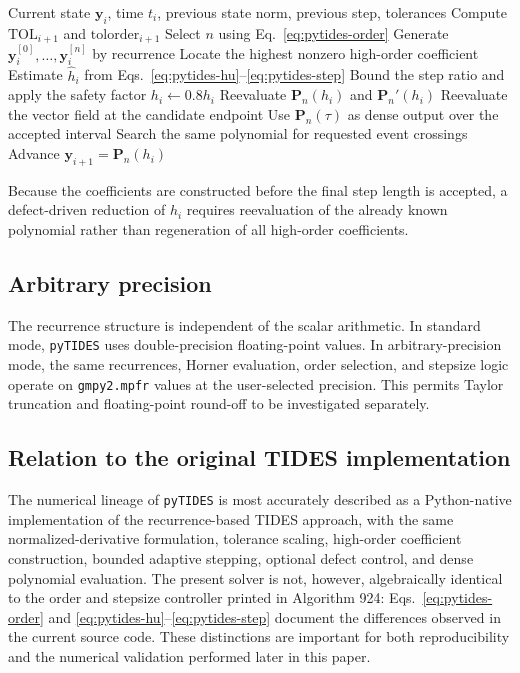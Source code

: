 \documentclass[11pt]{article}
\begin{document}
\begin{algorithm}
\caption{Adaptive Taylor propagation in \texttt{pyTIDES}}
\label{alg:taylor}
\begin{algorithmic}[1]
\Require Current state $\bm y_i$, time $t_i$, previous state norm,
         previous step, tolerances
\State Compute $\mathrm{TOL}_{i+1}$ and $\mathrm{tolorder}_{i+1}$
\State Select $n$ using Eq.~\eqref{eq:pytides-order}
\State Generate $\bm y_i^{[0]},\ldots,\bm y_i^{[n]}$ by recurrence
\State Locate the highest nonzero high-order coefficient
\State Estimate $\widehat h_i$ from
       Eqs.~\eqref{eq:pytides-hu}--\eqref{eq:pytides-step}
\State Bound the step ratio and apply the safety factor
        \State $h_i\gets0.8h_i$
        \State Reevaluate $\bm P_n(h_i)$ and $\bm P_n'(h_i)$
        \State Reevaluate the vector field at the candidate endpoint
    \EndWhile
\EndIf
\State Use $\bm P_n(\tau)$ as dense output over the accepted interval
\State Search the same polynomial for requested event crossings
\State Advance $\bm y_{i+1}=\bm P_n(h_i)$
\end{algorithmic}
\end{algorithm}

Because the coefficients are constructed before the final step length is
accepted, a defect-driven reduction of $h_i$ requires reevaluation of the
already known polynomial rather than regeneration of all high-order
coefficients.

\subsection{Arbitrary precision}

The recurrence structure is independent of the scalar arithmetic. In
standard mode, \texttt{pyTIDES} uses double-precision floating-point values.
In arbitrary-precision mode, the same recurrences, Horner evaluation, order
selection, and stepsize logic operate on \texttt{gmpy2.mpfr} values at the
user-selected precision. This permits Taylor truncation and floating-point
round-off to be investigated separately.

\subsection{Relation to the original TIDES implementation}

The numerical lineage of \texttt{pyTIDES} is most accurately described as a
Python-native implementation of the recurrence-based TIDES approach, with
the same normalized-derivative formulation, tolerance scaling, high-order
coefficient construction, bounded adaptive stepping, optional defect
control, and dense polynomial evaluation. The present solver is not,
however, algebraically identical to the order and stepsize controller printed
in Algorithm 924: Eqs.~\eqref{eq:pytides-order} and
\eqref{eq:pytides-hu}--\eqref{eq:pytides-step} document the differences
observed in the current source code. These distinctions are important for
both reproducibility and the numerical validation performed later in this
paper.
\end{document}
